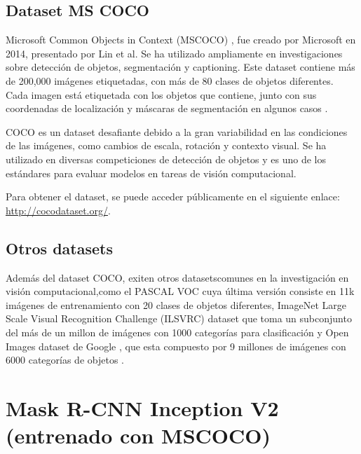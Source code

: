 \documentclass{article}
\begin{document}
\subsection{Dataset MS COCO}

Microsoft Common Objects in Context (MSCOCO) \cite{lin2015microsoftcococommonobjects}, fue creado por Microsoft en 2014, presentado por Lin et al. Se ha utilizado ampliamente en investigaciones sobre 
detección de objetos, segmentación y captioning. Este dataset contiene más de 200,000 imágenes etiquetadas, con más de 80 clases de objetos diferentes. Cada imagen
está etiquetada con los objetos que contiene, junto con sus coordenadas de localización y máscaras de segmentación en algunos casos \cite{lin2015microsoftcococommonobjects}.

COCO es un dataset desafiante debido a la gran variabilidad en las condiciones de las imágenes, como cambios de escala, rotación y contexto visual. Se ha utilizado
 en diversas competiciones de detección de objetos y es uno de los estándares para evaluar modelos en tareas de visión computacional.

Para obtener el dataset, se puede acceder públicamente en el siguiente enlace: \url{http://cocodataset.org/}.

\subsection{Otros datasets}
Además del dataset COCO, exiten otros datasetscomunes en la investigación en visión computacional,como el PASCAL VOC \cite{Everingham15} cuya última versión consiste en 11k imágenes de entrenamiento
con 20 clases de objetos diferentes, ImageNet Large Scale Visual Recognition Challenge (ILSVRC) \cite{russakovsky2015imagenetlargescalevisual} dataset que toma un subconjunto del más de un millon de imágenes con 1000
categorías para clasificación y Open Images dataset de Google \cite{Kuznetsova_2020}, que esta compuesto por 9 millones de imágenes con 6000 categorías de objetos \cite{zaidi2021surveymoderndeeplearning}.

\section{Mask R-CNN Inception V2 (entrenado con MSCOCO)}
\end{document}
